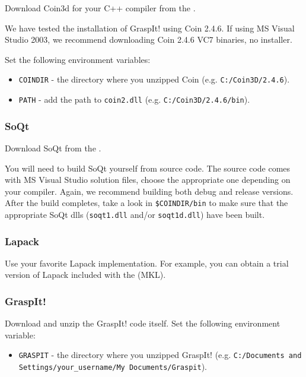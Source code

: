 Download Coin3d for your C++ compiler from the .

We have tested the installation of GraspIt! using Coin 2.4.6. If using
MS Visual Studio 2003, we recommend downloading Coin 2.4.6 VC7
binaries, no installer.

Set the following environment variables:

\begin{itemize}
\item \texttt{COINDIR} - the directory where you unzipped Coin (e.g. \texttt{C:/Coin3D/2.4.6}).
\item \texttt{PATH} - add the path to \texttt{coin2.dll} (e.g. \texttt{C:/Coin3D/2.4.6/bin}).
\end{itemize}

\subsubsection{SoQt}

Download SoQt from the .

You will need to build SoQt yourself from source code. The source code
comes with MS Visual Studio solution files, choose the appropriate one
depending on your compiler. Again, we recommend building both debug
and release versions. After the build completes, take a look in
\texttt{\$COINDIR/bin} to make sure that the appropriate SoQt dlls (\texttt{soqt1.dll} and/or \texttt{soqt1d.dll}) have been built.

\subsubsection{Lapack}

Use your favorite Lapack implementation. For example, you can obtain a
trial version of Lapack included with the  (MKL).

\subsubsection{GraspIt!}

Download and unzip the GraspIt! code itself. Set the following
environment variable:

\begin{itemize}
\item \texttt{GRASPIT} - the directory where you unzipped GraspIt! (e.g. \texttt{C:/Documents and Settings/your\_username/My Documents/Graspit}).
\end{itemize}


